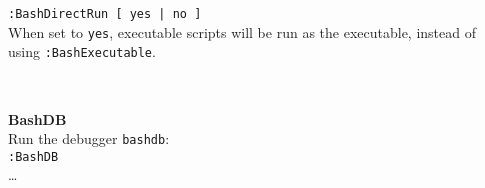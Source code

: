 \documentclass[oneside,11pt,landscape,DIV16]{scrartcl}
\begin{document}
\begin{multicols}{3}
\begin{center}
\begin{minipage}[b]{72mm}
\texttt{:BashDirectRun [ yes | no ]} \\[0.5ex]
When set to \texttt{yes}, executable scripts will be run as the executable, instead of using \texttt{:BashExecutable}.
\end{minipage}
\\[2.5ex]
%
\begin{minipage}[b]{72mm}%
\large{\textbf{BashDB}}\\[1.0ex]
Run the debugger \texttt{bashdb}: \\[0.5ex]
\texttt{:BashDB} \\[1.0ex]
\dots
\end{minipage}
%
\end{center}%
\end{multicols}%
%
\end{document}
